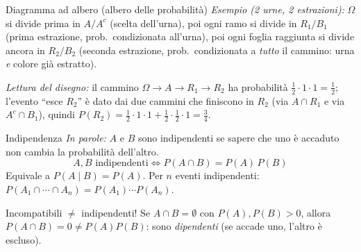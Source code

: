 \documentclass[11pt]{article}
\newcommand{\inparole}[1]{\emph{In parole:} #1}
\begin{document}
\begin{concetto}[barBlue]{Diagramma ad albero (albero delle probabilit\`a)}
\emph{Esempio (2 urne, 2 estrazioni):} $\Omega$ si divide prima in $A/A^c$ (scelta dell'urna), poi ogni ramo si divide in $R_1/B_1$ (prima estrazione, prob.\ condizionata all'urna), poi ogni foglia raggiunta si divide ancora in $R_2/B_2$ (seconda estrazione, prob.\ condizionata a \emph{tutto} il cammino: urna \emph{e} colore gi\`a estratto).

\begin{center}
\end{center}

\emph{Lettura del disegno:} il cammino $\Omega\to A\to R_1\to R_2$ ha probabilit\`a $\frac12\cdot1\cdot1=\frac12$; l'evento ``esce $R_2$'' \`e dato dai due cammini che finiscono in $R_2$ (via $A\cap R_1$ e via $A^c\cap B_1$), quindi $P(R_2)=\frac12\cdot1\cdot1+\frac12\cdot\frac12\cdot1=\frac34$.
\end{concetto}

\begin{concetto}{Indipendenza}
\inparole{$A$ e $B$ sono indipendenti se sapere che uno \`e accaduto non cambia la probabilit\`a dell'altro.}
\[ A, B \text{ indipendenti} \iff P(A \cap B) = P(A)\, P(B) \]
Equivale a $P(A \mid B) = P(A)$. Per $n$ eventi indipendenti: $P(A_1 \cap \cdots \cap A_n) = P(A_1)\cdots P(A_n)$.
\end{concetto}

\begin{attenzione}
Incompatibili $\neq$ indipendenti! Se $A \cap B = \emptyset$ con $P(A),P(B)>0$, allora $P(A\cap B)=0 \neq P(A)P(B)$: sono \emph{dipendenti} (se accade uno, l'altro \`e escluso).
\end{attenzione}
\end{document}
